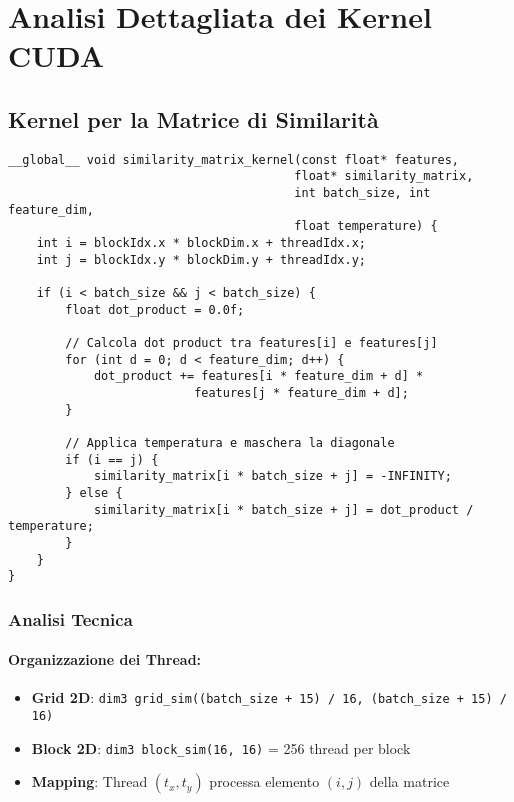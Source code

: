 \documentclass[a4paper,11pt]{article}
\begin{document}
\section{Analisi Dettagliata dei Kernel CUDA}

\subsection{Kernel per la Matrice di Similarità}

\begin{lstlisting}[caption={Kernel per il calcolo della matrice di similarità}]
__global__ void similarity_matrix_kernel(const float* features, 
                                        float* similarity_matrix, 
                                        int batch_size, int feature_dim, 
                                        float temperature) {
    int i = blockIdx.x * blockDim.x + threadIdx.x;
    int j = blockIdx.y * blockDim.y + threadIdx.y;
    
    if (i < batch_size && j < batch_size) {
        float dot_product = 0.0f;
        
        // Calcola dot product tra features[i] e features[j]
        for (int d = 0; d < feature_dim; d++) {
            dot_product += features[i * feature_dim + d] * 
                          features[j * feature_dim + d];
        }
        
        // Applica temperatura e maschera la diagonale
        if (i == j) {
            similarity_matrix[i * batch_size + j] = -INFINITY;
        } else {
            similarity_matrix[i * batch_size + j] = dot_product / temperature;
        }
    }
}
\end{lstlisting}

\subsubsection{Analisi Tecnica}

\paragraph{Organizzazione dei Thread:}
\begin{itemize}
    \item \textbf{Grid 2D}: \texttt{dim3 grid\_sim((batch\_size + 15) / 16, (batch\_size + 15) / 16)}
    \item \textbf{Block 2D}: \texttt{dim3 block\_sim(16, 16)} = 256 thread per block
    \item \textbf{Mapping}: Thread \((t_x, t_y)\) processa elemento \((i, j)\) della matrice
\end{itemize}
\end{document}

